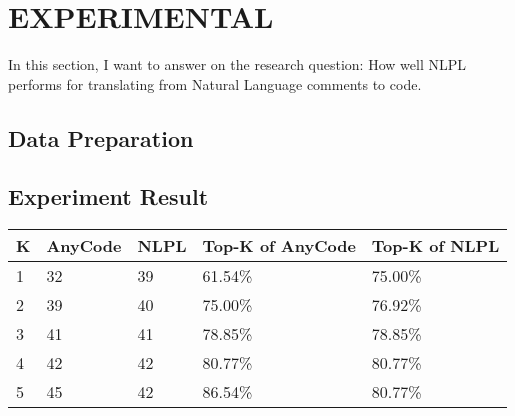 \chapter{EXPERIMENTAL}
In this section, I want to answer on the research question: How well NLPL performs for translating from Natural Language comments to code.  
\section{Data Preparation}

\section{Experiment Result}

\begin{table}[]
	\begin{tabular}{|l|l|l|l|l|}
		\hline
		\textbf{K} & \textbf{AnyCode} & \textbf{NLPL} & \textbf{Top-K of AnyCode} & \textbf{Top-K of NLPL} \\ \hline
		1              & 32               & 39            & 61.54\%                   & 75.00\%                \\ \hline
		2              & 39               & 40            & 75.00\%                   & 76.92\%                \\ \hline
		3              & 41               & 41            & 78.85\%                   & 78.85\%                \\ \hline
		4              & 42               & 42            & 80.77\%                   & 80.77\%                \\ \hline
		5              & 45               & 42            & 86.54\%                   & 80.77\%                \\ \hline
	\end{tabular}
\end{table}

